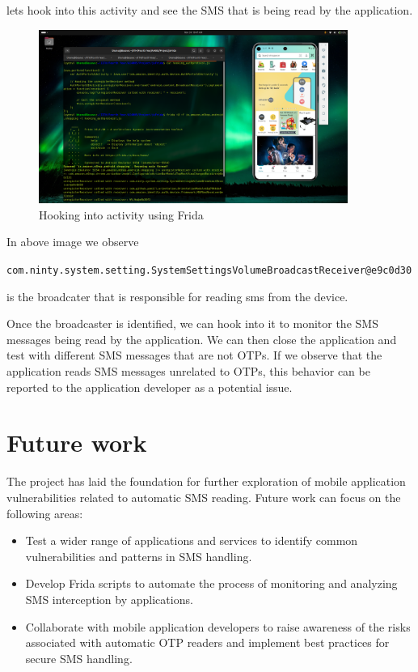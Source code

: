 \documentclass[a4paper,12pt]{article}
\begin{document}
lets hook into this activity and see the SMS that is being read by the application.
\begin{figure}[h]
    \centering
    \includegraphics[width=0.9\textwidth]{../images/hooked_auth_protocol.png}
    \caption{Hooking into activity using Frida}
\end{figure}

In above image we observe 

\noindent \texttt{com.ninty.system.setting.SystemSettingsVolumeBroadcastReceiver@e9c0d30}

is the broadcater that is responsible for reading sms from the device.

Once the broadcaster is identified, we can hook into it to monitor the SMS messages being read by the application. We can then close the application and test with different SMS messages that are not OTPs. If we observe that the application reads SMS messages unrelated to OTPs, this behavior can be reported to the application developer as a potential issue.

\section{Future work}
The project has laid the foundation for further exploration of mobile application vulnerabilities related to automatic SMS reading. Future work can focus on the following areas:
\begin{itemize}
    \item Test a wider range of applications and services to identify common vulnerabilities and patterns in SMS handling.
    \item Develop Frida scripts to automate the process of monitoring and analyzing SMS interception by applications.
    \item Collaborate with mobile application developers to raise awareness of the risks associated with automatic OTP readers and implement best practices for secure SMS handling.
\end{itemize}
\end{document}
